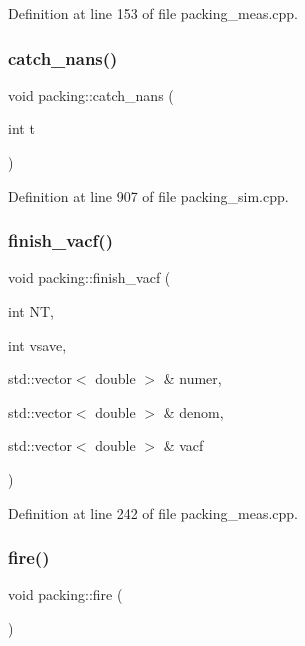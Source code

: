 Definition at line 153 of file packing\+\_\+meas.\+cpp.

\mbox{\label{classpacking_ac31d7a9a0e3fde8ca3b527f6fc3f2b45}} 
\subsubsection{\texorpdfstring{catch\+\_\+nans()}{catch\_nans()}}
{\footnotesize\ttfamily void packing\+::catch\+\_\+nans (\begin{DoxyParamCaption}\item[{int}]{t }\end{DoxyParamCaption})}



Definition at line 907 of file packing\+\_\+sim.\+cpp.

\mbox{\label{classpacking_a4eaacbf9a4212c3bdf61315317b21529}} 
\subsubsection{\texorpdfstring{finish\+\_\+vacf()}{finish\_vacf()}}
{\footnotesize\ttfamily void packing\+::finish\+\_\+vacf (\begin{DoxyParamCaption}\item[{int}]{NT,  }\item[{int}]{vsave,  }\item[{std\+::vector$<$ double $>$ \&}]{numer,  }\item[{std\+::vector$<$ double $>$ \&}]{denom,  }\item[{std\+::vector$<$ double $>$ \&}]{vacf }\end{DoxyParamCaption})}



Definition at line 242 of file packing\+\_\+meas.\+cpp.

\mbox{\label{classpacking_af0edc401a0cb530600f0219e24518f23}} 
\subsubsection{\texorpdfstring{fire()}{fire()}}
{\footnotesize\ttfamily void packing\+::fire (\begin{DoxyParamCaption}{ }\end{DoxyParamCaption})}



